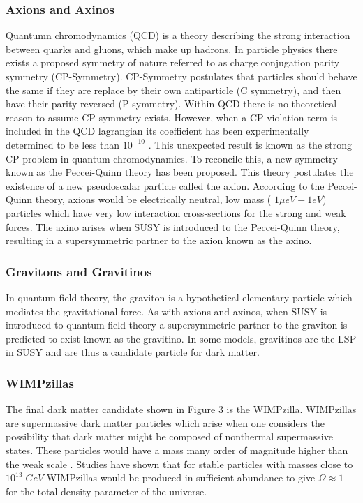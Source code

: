 \documentclass[a4paper,12pt]{article}
\begin{document}
\subsubsection{Axions and Axinos}
Quantumn chromodynamics (QCD) is a theory describing the strong interaction between quarks and gluons, which make up hadrons.  In particle physics there exists a proposed symmetry of nature referred to as charge conjugation parity symmetry (CP-Symmetry).  CP-Symmetry postulates that particles should behave the same if they are replace by their own antiparticle (C symmetry), and then have their parity reversed (P symmetry). Within QCD there is no theoretical reason to assume CP-symmetry exists.  However, when a CP-violation term is included in the QCD lagrangian its coefficient has been experimentally determined to be less than $10^{-10}$ \cite{Baluni}. This unexpected result is known as the strong CP problem in quantum chromodynamics.    To reconcile this, a new symmetry known as the Peccei-Quinn theory has been proposed.  This theory postulates the existence of a new pseudoscalar particle called the axion.  According to the Peccei-Quinn theory, axions would be electrically neutral, low mass ( $1\mu eV - 1 eV$) particles which have very low interaction cross-sections for the strong and weak forces.  The axino arises when SUSY is introduced to the Peccei-Quinn theory, resulting in a supersymmetric partner to the axion known as the axino.

\subsubsection{Gravitons and Gravitinos}
In quantum field theory, the graviton is a hypothetical  elementary particle which mediates the gravitational force.  As with axions and axinos, when SUSY is introduced to quantum field theory a supersymmetric partner to the graviton is predicted to exist known as the gravitino.  In some models, gravitinos are the LSP in SUSY and are thus a candidate particle for dark matter.

\subsubsection{WIMPzillas}
The final dark matter candidate shown in Figure 3 is the WIMPzilla.  WIMPzillas are supermassive dark matter particles which arise when one considers the possibility that dark matter might be composed of nonthermal supermassive states. These particles would have a mass many order of magnitude higher than the weak scale \cite{Chung}. Studies have shown that for stable particles with masses close to $10^{13} \; GeV$  WIMPzillas would be produced in sufficient abundance to give $\Omega \approx 1$ for the total density parameter of the universe.  
\end{document}
